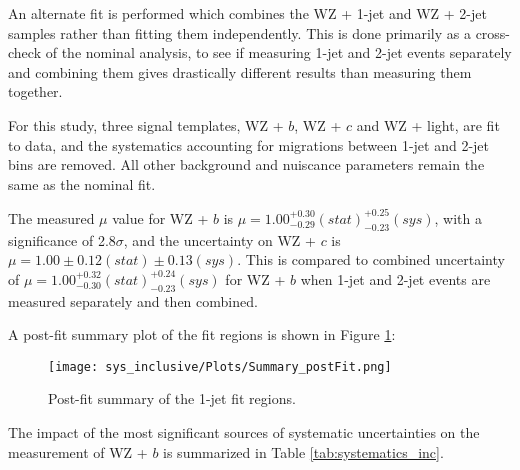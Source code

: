
An alternate fit is performed which combines the WZ + 1-jet and WZ + 2-jet samples rather than fitting them independently. This is done primarily as a cross-check of the nominal analysis, to see if measuring 1-jet and 2-jet events separately and combining them gives drastically different results than measuring them together. 

For this study, three signal templates, WZ + $b$, WZ + $c$ and WZ + light, are fit to data, and the systematics accounting for migrations between 1-jet and 2-jet bins are removed. All other background and nuiscance parameters remain the same as the nominal fit. 

The measured $\mu$ value for WZ + $b$ is  $\mu = 1.00^{+0.30}_{-0.29}(stat)^{+0.25}_{-0.23}(sys)$, with a significance of 2.8$\sigma$, and the uncertainty on WZ + $c$ is $\mu = 1.00\pm 0.12 (stat)\pm 0.13 (sys)$. This is compared to combined uncertainty of $\mu = 1.00^{+0.32}_{-0.30}(stat)^{+0.24}_{-0.23}(sys)$ for WZ + $b$ when 1-jet and 2-jet events are measured separately and then combined.

A post-fit summary plot of the fit regions is shown in Figure \ref{fig:fit_results_inc}: 

\begin{figure}[H]
    \center
    \texttt{[image: sys\_inclusive/Plots/Summary\_postFit.png]}
    \caption{Post-fit summary of the 1-jet fit regions.}
    \label{fig:fit_results_inc}
\end{figure}

The impact of the most significant sources of systematic uncertainties on the measurement of WZ + $b$ is summarized in Table \ref{tab:systematics_inc}. 

